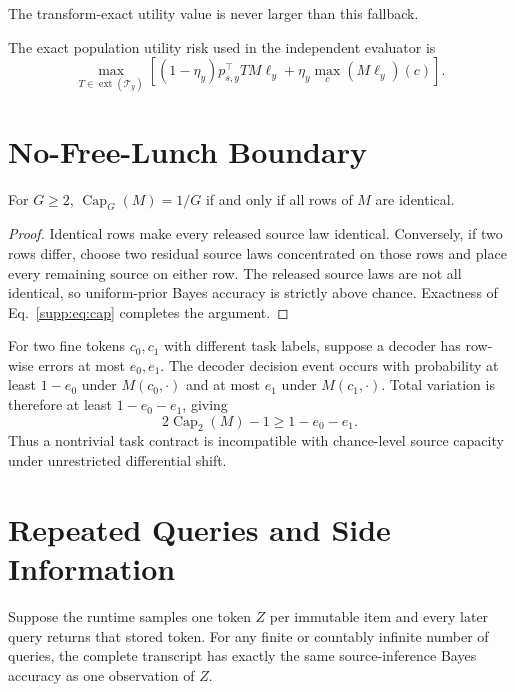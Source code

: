 The transform-exact utility value is never larger than this fallback.

The exact population utility risk used in the independent evaluator is
\begin{equation}
 \max_{T\in\operatorname{ext}(\mathcal T_y)}
 \left[(1-\eta_y)p_{s,y}^\top TM\ell_y
 +\eta_y\max_c(M\ell_y)(c)\right].
 \label{supp:eq:exactutility}
\end{equation}

\section{No-Free-Lunch Boundary}

\begin{theorem}
For $G\geq2$, $\operatorname{Cap}_G(M)=1/G$ if and only if all rows of $M$ are
identical.
\end{theorem}

\begin{proof}
Identical rows make every released source law identical. Conversely, if two
rows differ, choose two residual source laws concentrated on those rows and
place every remaining source on either row. The released source laws are not
all identical, so uniform-prior Bayes accuracy is strictly above chance.
Exactness of Eq.~\eqref{supp:eq:cap} completes the argument.
\end{proof}

For two fine tokens $c_0,c_1$ with different task labels, suppose a decoder has
row-wise errors at most $e_0,e_1$. The decoder decision event occurs with
probability at least $1-e_0$ under $M(c_0,\cdot)$ and at most $e_1$ under
$M(c_1,\cdot)$. Total variation is therefore at least $1-e_0-e_1$, giving
\begin{equation}
 2\operatorname{Cap}_2(M)-1\geq1-e_0-e_1.
 \label{supp:eq:utilitylower}
\end{equation}
Thus a nontrivial task contract is incompatible with chance-level source
capacity under unrestricted differential shift.

\section{Repeated Queries and Side Information}

\begin{proposition}
Suppose the runtime samples one token $Z$ per immutable item and every later
query returns that stored token. For any finite or countably infinite number of
queries, the complete transcript has exactly the same source-inference Bayes
accuracy as one observation of $Z$.
\end{proposition}

